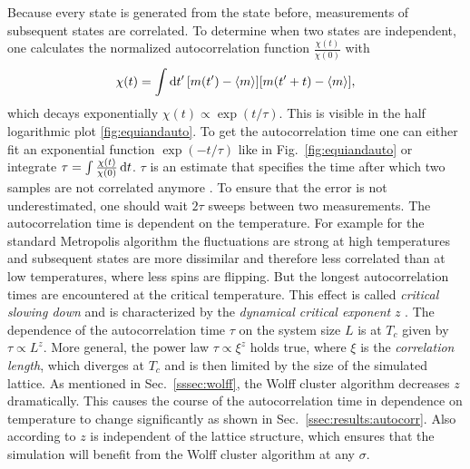         Because every state is generated from the state before, measurements
        of subsequent states are correlated. To determine when two states
        are independent, one calculates the normalized autocorrelation function
        \(\frac{\chi(t)}{\chi(0)}\) with
        \begin{equation}
            \chi(t) = \int \mathrm{d} t' \, [m(t') -\left< m \right>][m(t'+t)-\left< m \right>],
        \end{equation}
        which decays exponentially
        \(\chi(t) \propto \exp(t/\tau)\). This is visible in the half
        logarithmic plot \ref{fig:equiandauto}.
        To get the autocorrelation time one can either fit an exponential
        function \(\exp(-t/\tau)\) like in Fig.\ \ref{fig:equiandauto}
        or integrate \(\tau = \int \frac{\chi(t)}{\chi(0)} \,\mathrm{d} t\).
        \(\tau\) is an estimate that specifies the time after which two
        samples are not correlated anymore \cite[p. 59ff]{NewmanBarkema1999} \cite[p. 150f]{Katzgraber2011}.
        To ensure that the error is not underestimated, one should wait
        \(2\tau\) sweeps between two measurements.
        The autocorrelation time is dependent on the temperature.
        For example for the standard Metropolis algorithm the fluctuations
        are strong at high temperatures and subsequent
        states are more dissimilar and therefore less correlated than at low
        temperatures, where less spins are flipping. But the longest
        autocorrelation times are encountered at the critical temperature.
        This effect is called \emph{critical slowing down} and is
        characterized by the \emph{dynamical critical exponent} \(z\)
        \cite{SwendsenWang1987}. The dependence of the autocorrelation time
        \(\tau\) on the system size \(L\) is at \(T_{c}\) given by \(\tau \propto L^z\).
        More general, the power law \(\tau \propto \xi^z\) holds true, where
        \(\xi\) is the \emph{correlation length}, which diverges at
        \(T_{c}\) and is then limited by the size of the simulated lattice.
        As mentioned in Sec.\ \ref{sssec:wolff}, the Wolff cluster algorithm
        decreases \(z\) dramatically. This causes the course of the autocorrelation
        time in dependence on temperature to change significantly as shown in
        Sec.\ \ref{ssec:results:autocorr}. Also according to \cite{NewmanBarkema1999}
        \(z\) is independent of the lattice structure, which ensures that
        the simulation will benefit from the Wolff cluster algorithm at
        any \(\sigma\).
